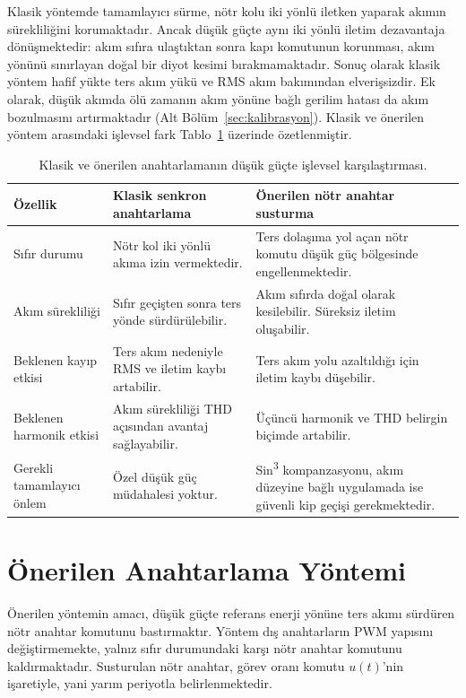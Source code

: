 Klasik yöntemde tamamlayıcı sürme, nötr kolu iki yönlü iletken yaparak akımın sürekliliğini korumaktadır. Ancak düşük güçte aynı iki yönlü iletim dezavantaja dönüşmektedir: akım sıfıra ulaştıktan sonra kapı komutunun korunması, akım yönünü sınırlayan doğal bir diyot kesimi bırakmamaktadır. Sonuç olarak klasik yöntem hafif yükte ters akım yükü ve RMS akım bakımından elverişsizdir. Ek olarak, düşük akımda ölü zamanın akım yönüne bağlı gerilim hatası da akım bozulmasını artırmaktadır (Alt Bölüm~\ref{sec:kalibrasyon}). Klasik ve önerilen yöntem arasındaki işlevsel fark Tablo~\ref{tab:klasik-onerilen-islevsel} üzerinde özetlenmiştir.

\begin{table}[H]
  \centering
  \caption{Klasik ve önerilen anahtarlamanın düşük güçte işlevsel karşılaştırması.}
  \label{tab:klasik-onerilen-islevsel}
  \small
  \begin{tabularx}{\textwidth}{p{} X X}
    \toprule
    Özellik & Klasik senkron anahtarlama & Önerilen nötr anahtar susturma \\
    \midrule
    Sıfır durumu & Nötr kol iki yönlü akıma izin vermektedir. & Ters dolaşıma yol açan nötr komutu düşük güç bölgesinde engellenmektedir. \\
    Akım sürekliliği & Sıfır geçişten sonra ters yönde sürdürülebilir. & Akım sıfırda doğal olarak kesilebilir. Süreksiz iletim oluşabilir. \\
    Beklenen kayıp etkisi & Ters akım nedeniyle RMS ve iletim kaybı artabilir. & Ters akım yolu azaltıldığı için iletim kaybı düşebilir. \\
    Beklenen harmonik etkisi & Akım sürekliliği THD açısından avantaj sağlayabilir. & Üçüncü harmonik ve THD belirgin biçimde artabilir. \\
    Gerekli tamamlayıcı önlem & Özel düşük güç müdahalesi yoktur. & Sin\textsuperscript{3} kompanzasyonu, akım düzeyine bağlı uygulamada ise güvenli kip geçişi gerekmektedir. \\
    \bottomrule
  \end{tabularx}
\end{table}

\section{Önerilen Anahtarlama Yöntemi}

Önerilen yöntemin amacı, düşük güçte referans enerji yönüne ters akımı sürdüren nötr anahtar komutunu bastırmaktır. Yöntem dış anahtarların PWM yapısını değiştirmemekte, yalnız sıfır durumundaki karşı nötr anahtar komutunu kaldırmaktadır. Susturulan nötr anahtar, görev oranı komutu $u(t)$'nin işaretiyle, yani yarım periyotla belirlenmektedir.

